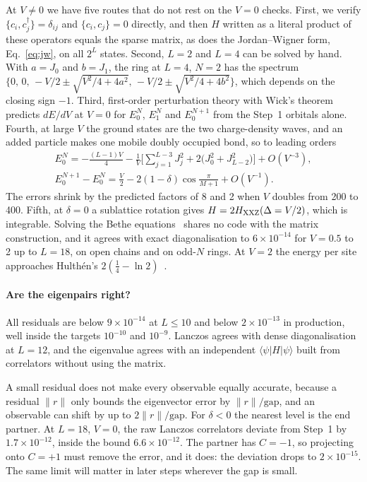 \documentclass[11pt,a4paper]{article}
\newcommand{\dg}{^{\dagger}}
\begin{document}
At $V\neq0$ we have five routes that do not rest on the $V=0$ checks.
First, we verify $\{c_i,c_j\dg\}=\delta_{ij}$ and $\{c_i,c_j\}=0$ directly, and then $H$ written as a literal product of these operators equals the sparse matrix, as does the Jordan--Wigner form, Eq.~\eqref{eq:jw}, on all $2^L$ states.
Second, $L=2$ and $L=4$ can be solved by hand.
With $a=J_0$ and $b=J_1$, the ring at $L=4$, $N=2$ has the spectrum $\{0,\,0,\,-V/2\pm\sqrt{V^2/4+4a^2},\,-V/2\pm\sqrt{V^2/4+4b^2}\}$, which depends on the closing sign $-1$.
Third, first-order perturbation theory with Wick's theorem predicts $dE/dV$ at $V=0$ for $E_0^N$, $E_1^N$ and $E_0^{N+1}$ from the Step~1 orbitals alone.
Fourth, at large $V$ the ground states are the two charge-density waves, and an added particle makes one mobile doubly occupied bond, so to leading orders
\begin{gather}
  E_0^N = -\frac{(L-1)V}{4} - \frac1V\Big[\sum_{j=1}^{L-3}J_j^2+2\big(J_0^2+J_{L-2}^2\big)\Big] + O(V^{-3}),
  \\
  E_0^{N+1}-E_0^N = \frac V2 - 2(1-\delta)\cos\frac{\pi}{M+1} + O(V^{-1}).
\end{gather}
The errors shrink by the predicted factors of 8 and 2 when $V$ doubles from 200 to 400.
Fifth, at $\delta=0$ a sublattice rotation gives $H=2H_{\rm XXZ}(\Delta=V/2)$, which is integrable.
Solving the Bethe equations~\cite{alcaraz} shares no code with the matrix construction, and it agrees with exact diagonalisation to $6\times10^{-14}$ for $V=0.5$ to 2 up to $L=18$, on open chains and on odd-$N$ rings.
At $V=2$ the energy per site approaches Hulth\'en's $2(\tfrac14-\ln2)$~\cite{hulthen}.

\paragraph{Are the eigenpairs right?}
All residuals are below $9\times10^{-14}$ at $L\le10$ and below $2\times10^{-13}$ in production, well inside the targets $10^{-10}$ and $10^{-9}$.
Lanczos agrees with dense diagonalisation at $L=12$, and the eigenvalue agrees with an independent $\langle\psi|H|\psi\rangle$ built from correlators without using the matrix.

A small residual does not make every observable equally accurate, because a residual $\|r\|$ only bounds the eigenvector error by $\|r\|/\mathrm{gap}$, and an observable can shift by up to $2\|r\|/\mathrm{gap}$.
For $\delta<0$ the nearest level is the end partner.
At $L=18$, $V=0$, the raw Lanczos correlators deviate from Step~1 by $1.7\times10^{-12}$, inside the bound $6.6\times10^{-12}$.
The partner has $C=-1$, so projecting onto $C=+1$ must remove the error, and it does: the deviation drops to $2\times10^{-15}$.
The same limit will matter in later steps wherever the gap is small.
\end{document}
